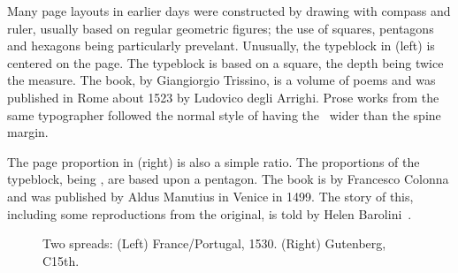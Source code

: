 \documentclass[10pt,a4paper,extrafontsizes]{memoir}
\begin{document}
\begin{paracol}{2}
\switchEng
 Many page layouts in earlier days were constructed by
drawing with compass and ruler, usually based on regular geometric figures; 
the use of squares, pentagons and hexagons being particularly
prevelant. Unusually, the typeblock in  (left) 
is centered on the page. The typeblock is based on a 
square, the depth being twice the measure. The book,  by 
Giangiorgio Trissino, is a volume of poems and was published in Rome 
about 1523 by Ludovico degli Arrighi. 
Prose works
from the same typographer followed the normal style of having the \foredge\
wider than the spine margin.

    The page proportion in  (right) is also a simple 
ratio. The proportions of the typeblock, being \ratio{1.7}{1}, 
are based upon a pentagon.
The book is  by Francesco Colonna and was
published by Aldus Manutius\index{Manutius, Aldus} in Venice in 1499. 
The story of this,
including some reproductions from the original, is told by Helen
Barolini~\autocite{BAROLINI92}.
\end{paracol}

\begin{figure}
\centering
\begin{minipage}[b]{\pwlayi}
\end{minipage}
\hfill
\begin{minipage}[b]{\pwlayi}
\end{minipage}
\caption[Two spreads: France/Portugal, 1530 and Gutenberg, C15th]%
        {Two spreads: (Left) France/Portugal, 1530.
         (Right) Gutenberg, C15th.} \label{fb:9}
\end{figure}
\end{document}
